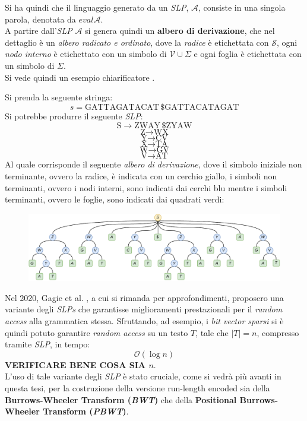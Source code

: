 Si ha quindi che il linguaggio generato da un \textit{SLP}, $\mathcal{A}$,
consiste in una singola parola, denotata da $eval{\mathcal{A}}$. \\
A partire dall'\textit{SLP} $\mathcal{A}$ si genera quindi un \textbf{albero
  di derivazione}, che nel dettaglio è un \textit{albero radicato e ordinato},
dove la \textit{radice} è etichettata con $\mathcal{S}$, ogni \textit{nodo
  interno} è etichettato con un simbolo di $\mathcal{V}\cup\Sigma$ e ogni foglia
è etichettata con un simbolo di $\Sigma$.\\
Si vede quindi un esempio chiarificatore \cite{slpgagie}.
\begin{esempio}
  \label{ese:slpgagie}
  Si prenda la seguente stringa:
  \[s=\mbox{GATTAGATACAT}\,\$\mbox{GATTACATAGAT}\]
  Si potrebbe produrre il seguente \emph{SLP}:
  \[\mbox{S}\to \mbox{ZWAY}\,\$\mbox{ZYAW}\]
  \[\mbox{Z}\to \mbox{WX}\]
  \[\mbox{Y}\to \mbox{CV}\]
  \[\mbox{X}\to \mbox{TA}\]
  \[\mbox{W}\to \mbox{GV}\]
  \[\mbox{V}\to \mbox{AT}\]
  Al quale corrisponde il seguente \emph{albero di derivazione}, dove il simbolo
  iniziale non terminante, ovvero la radice, è indicata con un cerchio giallo, i
  simboli non terminanti, ovvero i nodi interni, sono indicati dai cerchi blu
  mentre i simboli terminanti, ovvero le foglie, sono indicati dai quadrati
  verdi:
  \begin{figure}[H]
    \centering
    \includegraphics[width=\textwidth]{img/slpgagie.pdf}
  \end{figure}
\end{esempio}
Nel 2020, Gagie et al. \cite{slpgagie}, a cui si rimanda per approfondimenti,
proposero una variante degli \textit{SLPs} che garantisse miglioramenti
prestazionali per il \textit{random access} alla grammatica stessa. Sfruttando,
ad esempio, i \textit{bit vector sparsi} si è quindi potuto garantire
\textit{random access} su un testo $T$, tale che $|T|=n$, compresso tramite
\textit{SLP}, in tempo:
\[\mathcal{O}(\log n)\]
\textbf{VERIFICARE BENE COSA SIA $n$}.\\
L'uso di tale variante degli \textit{SLP} è stato cruciale, come si vedrà più
avanti in questa tesi, per la costruzione della versione run-length encoded sia
della \textbf{Burrows-Wheeler Transform (\textit{BWT})} che della
\textbf{Positional Burrows-Wheeler Transform (\textit{PBWT})}.
